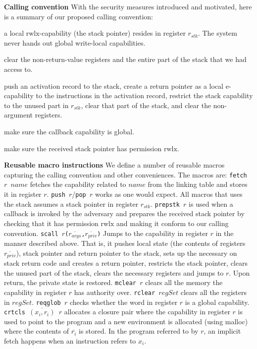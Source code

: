 \documentclass[compsoc,conference,letterpaper,fleqn]{IEEEtran}
\newcommand{\var}[1]{\mathit{#1}}
\newcommand{\stk}{\var{stk}}
\newcommand{\plainperm}[1]{\mathrm{#1}}
\newcommand{\entry}{\plainperm{e}}
\newcommand{\rwlx}{\plainperm{rwlx}}
\begin{document}
\textbf{Calling convention} With the security measures introduced and motivated,
here is a summary of our proposed calling convention:
\begin{description}[font=\normalfont\itshape]
\item[At program startup] a local $\rwlx$-capability (the stack pointer) resides in register $r_\stk$. The system never hands out global write-local capabilities.
\item[Before returning to the adversary] clear the non-return-value registers and the entire part of the stack that we had access to.
\item[Before invoking the adversary] push an activation record to the stack, create a return pointer as a local $\entry$-capability to the instructions in the activation record, restrict the stack capability to the unused part in $r_\stk$, clear that part of the stack, and clear the non-argument registers.
\item[Before invoking an adversary callback] make sure the callback capability is global.
\item[When called by an adversary] make sure the received stack pointer has permission $\rwlx$.
\end{description}
\textbf{Reusable macro instructions} 
We define a number of reusable macros capturing the calling convention and other conveniences. The macros are:
\texttt{\footnotesize{fetch $r$ $\var{name}$}} fetches the capability related to
$\var{name}$ from the linking table and stores it in register
$r$. \texttt{\footnotesize{push $r$}}/\texttt{\footnotesize{pop $r$}} works as one would expect. All
macros that uses the stack assumes a stack pointer in register
$r_\stk$.  \texttt{\footnotesize{prepstk $r$}} is used when a callback is invoked by
the adversary and prepares the received stack pointer by checking that
it has permission $\rwlx$ and making it conform to our calling convention. \texttt{\footnotesize{scall $r$($\overline{r_{\var{args}}}$,$\overline{r_{\var{priv}}}$)}} Jumps
to the capability in register $r$ in the manner described above. That
is, it pushes local state (the contents of registers
$\overline{r_{\var{priv}}}$), stack pointer and return pointer to the
stack, sets up the necessary on stack return code and creates a return
pointer, restricts the stack pointer, clears the unused part of the
stack, clears the necessary registers and jumps to $r$. Upon return,
the private state is restored. \texttt{\footnotesize{mclear $r$}} clears all the
memory the capability in register $r$ has authority
over. \texttt{\footnotesize{rclear $\var{regSet}$}} clears all the registers in
$\var{regSet}$. \texttt{\footnotesize{reqglob $r$}} checks whether the word in
register $r$ is a global capability. \texttt{\footnotesize{crtcls
  $\overline{(x_i,r_i)}$ $r$}} allocates a closure pair where the
capability in register $r$ is used to point to the program and a new
environment is allocated (using malloc) where the contents of
$\overline{r_i}$ is stored. In the program referred to by $r$, an
implicit fetch happens when an instruction refers to $x_i$.
\end{document}

